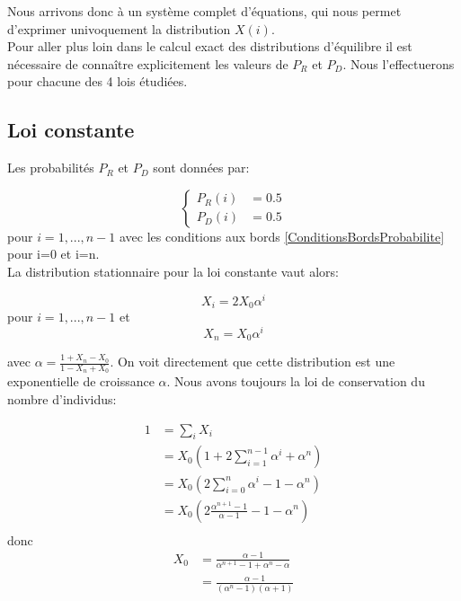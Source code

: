 Nous arrivons donc à un système complet d'équations, qui nous permet d'exprimer univoquement la distribution $X(i)$. \\


Pour aller plus loin dans le calcul exact des distributions d'équilibre il est nécessaire de connaître explicitement les valeurs de $P_R$ et $P_D$. Nous l'effectuerons pour chacune des 4 lois étudiées.


\subsection{Loi constante}
Les probabilités $P_R$ et $P_D$ sont données par:

\begin{equation}
\left \{
\begin{aligned}
P_R(i) &= 0.5\\
P_D(i) &= 0.5
\end{aligned}
\right.
\end{equation}
pour $i=1,...,n-1$ avec les conditions aux bords \ref{ConditionsBordsProbabilite} pour i=0 et i=n.\\

La distribution stationnaire pour la loi constante vaut alors:

\begin{equation}
X_i=2 X_0 \alpha^i
\end{equation}
pour $i=1,...,n-1$ et 
\begin{equation}
X_n= X_0 \alpha^i
\end{equation}

avec $\alpha = \frac{1+X_n-X_0}{1-X_n+X_0}$.
On voit directement que cette distribution est une exponentielle de croissance $\alpha$. Nous avons toujours la loi de conservation du nombre d'individus:

\begin{equation}
\begin{aligned}
1&= \sum_i X_i\\
	&= X_0 (1+2\sum_{i=1}^{n-1}\alpha^i+\alpha^n)\\
	&= X_0 (2\sum_{i=0}^{n}\alpha^i-1-\alpha^n)\\
	&= X_0 (2 \frac{\alpha^{n+1}-1}{\alpha-1}-1-\alpha^n)\\
\end{aligned}
\end{equation}
donc
\begin{equation}
\begin{aligned}
X_0	&= \frac{\alpha-1}{\alpha^{n+1}-1+\alpha^n-\alpha}\\
	&= \frac{\alpha-1}{(\alpha^{n}-1)(\alpha+1)}\\
\end{aligned}
\end{equation}

